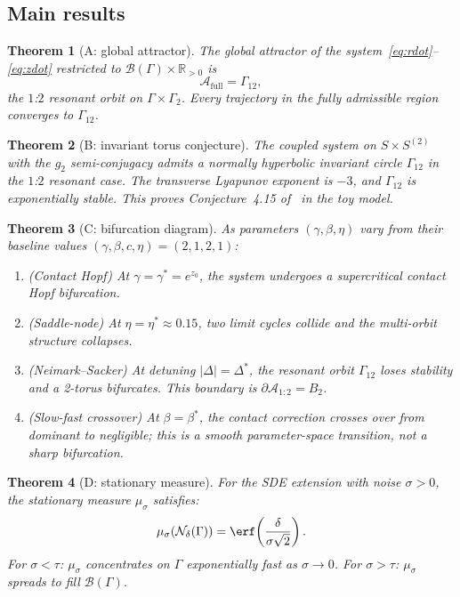 \documentclass[12pt, oneside]{book}
\theoremstyle{plain}
\newtheorem{theorem}{Theorem}[section]
\theoremstyle{definition}
\theoremstyle{remark}
\newcommand{\R}{\mathbb{R}}
\newcommand{\Orb}{\Gamma}
\newcommand{\cN}{\mathcal{N}}
\newcommand{\cB}{\mathcal{B}}
\newcommand{\abs}[1]{\left|#1\right|}
\begin{document}
\subsection{Main results}

\begin{theorem}[A: global attractor]\label{thm:A}
The global attractor of the system~\eqref{eq:rdot}--\eqref{eq:zdot}
restricted to $\cB(\Orb)\times\R_{>0}$ is
\[
  \mathcal{A}_{\mathrm{full}} = \Orb_{12},
\]
the $1$:$2$ resonant orbit on $\Orb\times\Orb_2$. Every trajectory
in the fully admissible region converges to $\Orb_{12}$.
\end{theorem}

\begin{theorem}[B: invariant torus conjecture]\label{thm:B}
The coupled system on $S\times S^{(2)}$ with the $g_2$ semi-conjugacy
admits a normally hyperbolic invariant circle $\Orb_{12}$ in the
$1$:$2$ resonant case. The transverse Lyapunov exponent is $-3$,
and $\Orb_{12}$ is exponentially stable. This proves
Conjecture~4.15 of~\cite{Paper1} in the toy model.
\end{theorem}

\begin{theorem}[C: bifurcation diagram]\label{thm:C}
As parameters $(\gamma,\beta,\eta)$ vary from their baseline values
$(\gamma,\beta,c,\eta)=(2,1,2,1)$:
\begin{enumerate}[label=\textup{(\roman*)}]
  \item \textup{(Contact Hopf)} At $\gamma=\gamma^*=e^{z_0}$, the
        system undergoes a supercritical contact Hopf bifurcation.
  \item \textup{(Saddle-node)} At $\eta=\eta^*\approx 0.15$, two
        limit cycles collide and the multi-orbit structure collapses.
  \item \textup{(Neimark--Sacker)} At detuning $\abs{\Delta}=\Delta^*$,
        the resonant orbit $\Orb_{12}$ loses stability and a 2-torus
        bifurcates. This boundary is $\partial\mathcal{A}_{1:2}=B_2$.
  \item \textup{(Slow-fast crossover)} At $\beta=\beta^*$, the
        contact correction crosses over from dominant to negligible;
        this is a smooth parameter-space transition, not a sharp
        bifurcation.
\end{enumerate}
\end{theorem}

\begin{theorem}[D: stationary measure]\label{thm:D}
For the SDE extension with noise $\sigma>0$, the stationary measure
$\mu_\sigma$ satisfies:
\[
  \mu_\sigma(\cN_\delta(\Orb)) = \erf\!\left(\frac{\delta}{\sigma\sqrt{2}}\right).
\]
For $\sigma<\tau$: $\mu_\sigma$ concentrates on $\Orb$ exponentially
fast as $\sigma\to 0$. For $\sigma>\tau$: $\mu_\sigma$ spreads to
fill $\cB(\Orb)$.
\end{theorem}
\end{document}
